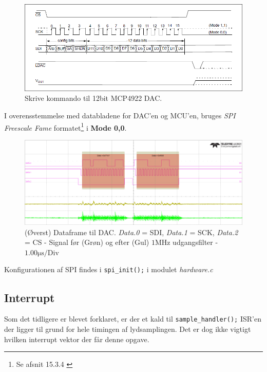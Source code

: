 \begin{figure}[h!]
	\centering
	\includegraphics[width=.8\textwidth]{billeder/dac12bit_writecmd.png}
	\caption{Skrive kommando til 12bit MCP4922 DAC.\cite[s. 25]{mcp4922}}
	\label{fig:dac12bit_writecmd}
\end{figure}

I overensstemmelse med databladene for DAC'en og MCU'en, bruges \emph{SPI Freescale Fame} formatet\footnote{Se afsnit 15.3.4 \cite[s. 954]{tm4c123gh6pm}} i \textbf{Mode 0,0}.

\begin{figure}[h!]
	\centering
	\includegraphics[width=\textwidth]{billeder/dac_dataframe.png}
	\caption{(Øverst) Dataframe til DAC. \textit{Data.0} = SDI, \textit{Data.1} = SCK, \textit{Data.2} = CS - Signal før (Grøn) og efter (Gul)  $1\si{\mega\hertz}$ udgangsfilter - $1.00\si{\micro\second}\text{/Div}$}
	\label{fig:dac_dataframe}
\end{figure}

Konfigurationen af SPI findes i \texttt{spi\_init();} i modulet \textit{hardware.c}  

\FloatBlock

\subsection{Interrupt}\label{subsec:interrupt}
Som det tidligere er blevet forklaret, er der et kald til \texttt{sample\_handler();} ISR'en der ligger til grund for hele timingen af lydsamplingen.
Det er dog ikke vigtigt hvilken interrupt vektor der får denne opgave.\\

